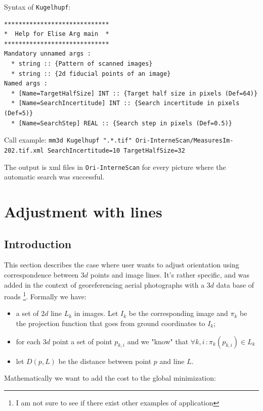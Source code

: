 Syntax of {\tt Kugelhupf}:
\begin{verbatim}
*****************************
*  Help for Elise Arg main  *
*****************************
Mandatory unnamed args : 
  * string :: {Pattern of scanned images}
  * string :: {2d fiducial points of an image}
Named args : 
  * [Name=TargetHalfSize] INT :: {Target half size in pixels (Def=64)}
  * [Name=SearchIncertitude] INT :: {Search incertitude in pixels (Def=5)}
  * [Name=SearchStep] REAL :: {Search step in pixels (Def=0.5)}
\end{verbatim}

Call example:
{\tt mm3d Kugelhupf ".*.tif" Ori-InterneScan/MeasuresIm-202.tif.xml SearchIncertitude=10 TargetHalfSize=32 }

The output is xml files in {\tt Ori-InterneScan} for every picture where the automatic search was successful.


\section{Adjustment with lines}



\subsection{Introduction}

This section describes the case where user wants to adjust orientation using correspondence between $3d$ points
and image lines. It's rather specific, and was added in the context of georeferencing aerial photographs with a $3d$
data base of roads \footnote{I am not sure to see if there exist other examples of application}. Formally we have:

\begin{itemize}
    \item a set of $2d$ line $L_k$ in images. Let $I_k$ be the corresponding image and $\pi_k$ be the projection
         function that goes from ground coordinates to $I_k$;
    \item for each $3d$ point a set of point $p_{k,i}$ and we "know" that $\forall k,i \, : \pi_k (p_{k,i}) \in L_k $
    \item let $D(p,L)$ be the distance between point $p$ and line $L$.
\end{itemize}

Mathematically we want to add the cost to the global minimization:

